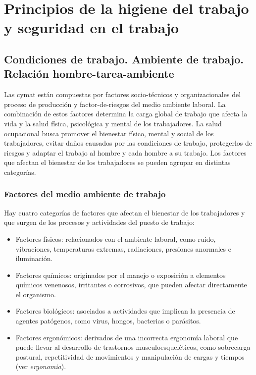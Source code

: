 \chapter{Principios de la higiene del trabajo y seguridad en el trabajo}

\section{Condiciones de trabajo. Ambiente de trabajo. Relación
  hombre-tarea-ambiente}

Las \acrfull{cymat} están compuestas por factores socio-técnicos y
organizacionales del proceso de producción y \glspl{factor-de-riesgo} del medio
ambiente laboral. La combinación de estos factores determina la carga global
de trabajo que afecta la vida y la salud física, psicológica y mental de los
trabajadores. La salud ocupacional busca promover el bienestar físico, mental
y social de los trabajadores, evitar daños causados por las condiciones de
trabajo, protegerlos de riesgos y adaptar el trabajo al hombre y cada hombre a
su trabajo. Los factores que afectan el bienestar de los trabajadores se pueden
agrupar en distintas categorías.

\subsection{Factores del medio ambiente de trabajo}

Hay cuatro categorías de factores que afectan el bienestar de los trabajadores
y que surgen de los procesos y actividades del puesto de trabajo:

\begin{itemize}
	\item Factores físicos: relacionados con el ambiente laboral, como ruido,
	      vibraciones, temperaturas extremas, radiaciones, presiones anormales e
	      iluminación.
	\item Factores químicos: originados por el manejo o exposición a elementos
	      químicos venenosos, irritantes o corrosivos, que pueden afectar
	      directamente el organismo.
	\item Factores biológicos: asociados a actividades que implican la
	      presencia de agentes patógenos, como virus, hongos, bacterias o
	      parásitos.
	\item Factores ergonómicos: derivados de una incorrecta ergonomía laboral
	      que puede llevar al desarrollo de trastornos musculoesqueléticos, como
	      sobrecarga postural, repetitividad de movimientos y manipulación de
	      cargas y tiempos (ver \textit{\gls{ergonomia}}).
\end{itemize}

